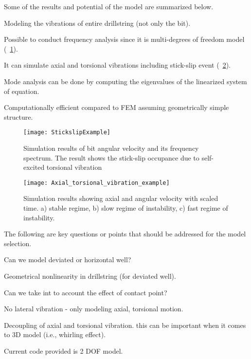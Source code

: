 Some of the results and potential of the model are summarized below.
\begin{bulletedlist}
  \item Modeling the vibrations of entire drillstring (not only the bit).
  \item Possible to conduct frequency analysis since it is multi-degrees of freedom model (\figurename~\ref{StickslipExample}).
  \item It can simulate axial and torsional vibrations including stick-slip event (\figurename~\ref{Axial_torsional_vibration_example}).
  \item Mode analysis can be done by computing the eigenvalues of the linearized system of equation.
  \item Computationally efficient compared to FEM assuming geometrically simple structure.
\end{bulletedlist}

\begin{figure}[ht]
  \centering
  \texttt{[image: StickslipExample]}
  \caption[Simulation results of bit angular velocity and its frequency spectrum]{Simulation results of bit angular velocity and its frequency spectrum. The result shows the stick-slip occupance due to self-excited torsional vibration}\label{StickslipExample}
\end{figure}


\begin{figure}[ht]
  \centering
  \texttt{[image: Axial\_torsional\_vibration\_example]}
  \caption[Simulation results showing axial and angular velocity with scaled time]{Simulation results showing axial and angular velocity with scaled time. a) stable regime, b) slow regime of instability, c) fast regime of instability.}\label{Axial_torsional_vibration_example}
\end{figure}

\noindent The following are key questions or points that should be addressed for the model selection.
\begin{bulletedlist}
  \item Can we model deviated or horizontal well?
  \item Geometrical nonlinearity in drillstring (for deviated well).
  \item Can we take int to account the effect of contact point?
  \item No lateral vibration - only modeling axial, torsional motion.
  \item Decoupling of axial and torsional vibration. this can be important when it comes to 3D model (i.e., whirling effect).
  \item Current code provided is 2 DOF model.
\end{bulletedlist} 

